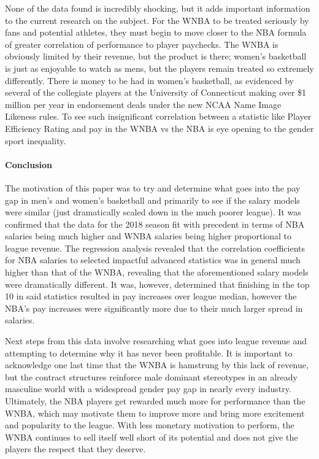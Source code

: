 \documentclass[12pt]{article}
\begin{document}
\par
None of the data found is incredibly shocking, but it adds important information to the current research on the subject. For the WNBA to be treated seriously by fans and potential athletes, they must begin to move closer to the NBA formula of greater correlation of performance to player paychecks. The WNBA is obviously limited by their revenue, but the product is there; women’s basketball is just as enjoyable to watch as mens, but the players remain treated so extremely differently. There is money to be had in women’s basketball, as evidenced by several of the collegiate players at the University of Connecticut making over \$1 million per year in endorsement deals under the new NCAA Name Image Likeness rules. To see such insignificant correlation between a statistic like Player Efficiency Rating and pay in the WNBA vs the NBA is eye opening to the gender sport inequality.

\paragraph{Conclusion}
The motivation of this paper was to try and determine what goes into the pay gap in men’s and women’s basketball and primarily to see if the salary models were similar (just dramatically scaled down in the much poorer league). It was confirmed that the data for the 2018 season fit with precedent in terms of NBA salaries being much higher and WNBA salaries being higher proportional to league revenue. The regression analysis revealed that the correlation coefficients for NBA salaries to selected impactful advanced statistics was in general much higher than that of the WNBA, revealing that the aforementioned salary models were dramatically different. It was, however, determined that finishing in the top 10 in said statistics resulted in pay increases over league median, however the NBA’s pay increases were significantly more due to their much larger spread in salaries. 
\par
Next steps from this data involve researching what goes into league revenue and attempting to determine why it has never been profitable. It is important to acknowledge one last time that the WNBA is hamstrung by this lack of revenue, but the contract structures reinforce male dominant stereotypes in an already masculine world with a widespread gender pay gap in nearly every industry. Ultimately, the NBA players get rewarded much more for performance than the WNBA, which may motivate them to improve more and bring more excitement and popularity to the league. With less monetary motivation to perform, the WNBA continues to sell itself well short of its potential and does not give the players the respect that they deserve. 






\end{document}
